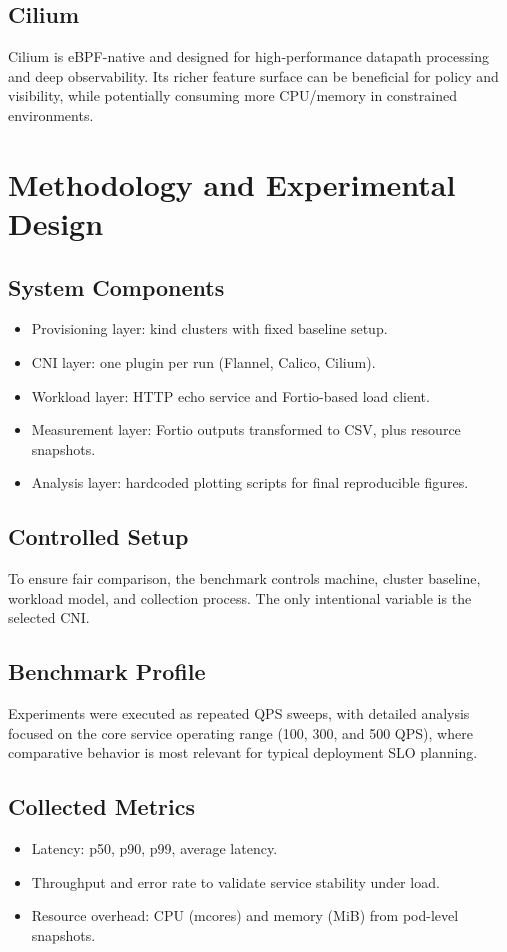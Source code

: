 \documentclass[12pt,a4paper]{article}
\begin{document}
\subsection{Cilium}
Cilium is eBPF-native and designed for high-performance datapath processing and deep observability. Its richer feature surface can be beneficial for policy and visibility, while potentially consuming more CPU/memory in constrained environments.

\section{Methodology and Experimental Design}
\subsection{System Components}
\begin{itemize}[leftmargin=1.5em]
    \item Provisioning layer: kind clusters with fixed baseline setup.
    \item CNI layer: one plugin per run (Flannel, Calico, Cilium).
    \item Workload layer: HTTP echo service and Fortio-based load client.
    \item Measurement layer: Fortio outputs transformed to CSV, plus resource snapshots.
    \item Analysis layer: hardcoded plotting scripts for final reproducible figures.
\end{itemize}

\subsection{Controlled Setup}
To ensure fair comparison, the benchmark controls machine, cluster baseline, workload model, and collection process. The only intentional variable is the selected CNI.

\subsection{Benchmark Profile}
Experiments were executed as repeated QPS sweeps, with detailed analysis focused on the core service operating range (100, 300, and 500 QPS), where comparative behavior is most relevant for typical deployment SLO planning.

\subsection{Collected Metrics}
\begin{itemize}[leftmargin=1.5em]
    \item Latency: p50, p90, p99, average latency.
    \item Throughput and error rate to validate service stability under load.
    \item Resource overhead: CPU (mcores) and memory (MiB) from pod-level snapshots.
\end{itemize}
\end{document}
